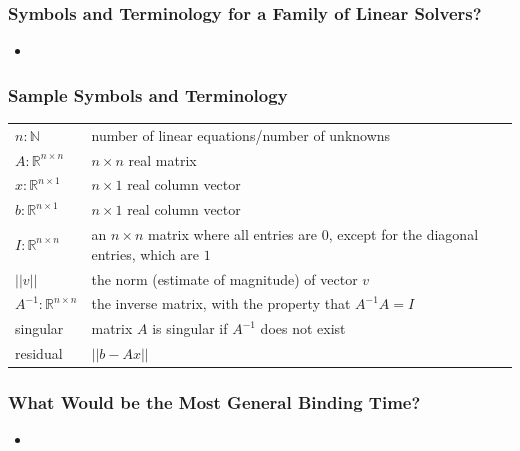 \documentclass[t,12pt,numbers,fleqn]{beamer}
\begin{document}
\begin{frame}
\frametitle{Symbols and Terminology for a Family of Linear Solvers?}

\begin{itemize}
	
\item {}
    
\end{itemize}

\end{frame}


\begin{frame}
\frametitle{Sample Symbols and Terminology}

\begin{table}[h]
\begin{tabular}{ l p{7.5cm}}
$n: \mathbb{N}$ & number of linear equations/number of unknowns\\
$A: \mathbb{R}^{n \times n}$ & $n \times n$ real matrix\\
$x: \mathbb{R}^{n \times 1}$ & $n \times 1$ real column vector\\
$b: \mathbb{R}^{n \times 1}$ & $n \times 1$ real column vector\\
$I: \mathbb{R}^{n \times n}$ & an $n \times n$ matrix where all entries are $0$, except for the diagonal entries, which
are $1$\\
$|| v || $ & the norm (estimate of magnitude) of vector $v$\\
$A^{-1}: \mathbb{R}^{n \times n}$ & the inverse matrix, with the property that $A^{-1} A = I$\\
singular & matrix $A$ is singular if $A^{-1}$ does not exist\\
residual & $|| b - A x ||$\\
\end{tabular}
\end{table}

\end{frame}


\begin{frame}
\frametitle{What Would be the Most General Binding Time?}

\begin{itemize}
	
\item {}
    
\end{itemize}


\end{frame}
\end{document}
